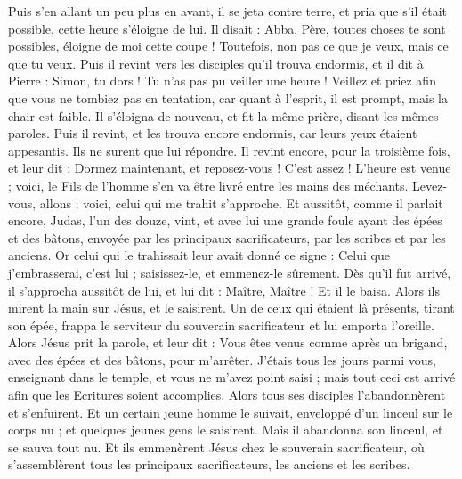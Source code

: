 \begin{multicols}{2}
Puis s'en allant un peu plus en avant, il se jeta contre terre, et pria que s'il était possible, cette heure s’éloigne de lui.
Il disait : Abba, Père, toutes choses te sont possibles, éloigne de moi cette coupe ! Toutefois, non pas ce que je veux, mais ce que tu veux.
Puis il revint vers les disciples qu’il trouva endormis, et il dit à Pierre : Simon, tu dors ! Tu n’as pas pu veiller une heure !
Veillez et priez afin que vous ne tombiez pas en tentation, car quant à l’esprit, il est prompt, mais la chair est faible.
Il s’éloigna de nouveau, et fit la même prière, disant les mêmes paroles.
Puis il revint, et les trouva encore endormis, car leurs yeux étaient appesantis. Ils ne surent que lui répondre.
Il revint encore, pour la troisième fois, et leur dit : Dormez maintenant, et reposez-vous ! C’est assez ! L’heure est venue ; voici, le Fils de l'homme s'en va être livré entre les mains des méchants.
Levez-vous, allons ; voici, celui qui me trahit s'approche.
Et aussitôt, comme il parlait encore, Judas, l'un des douze, vint, et avec lui une grande foule ayant des épées et des bâtons, envoyée par les principaux sacrificateurs, par les scribes et par les anciens.
Or celui qui le trahissait leur avait donné ce signe : Celui que j'embrasserai, c’est lui ; saisissez-le, et emmenez-le sûrement.
Dès qu’il fut arrivé, il s'approcha aussitôt de lui, et lui dit : Maître, Maître ! Et il le baisa.
Alors ils mirent la main sur Jésus, et le saisirent.
Un de ceux qui étaient là présents, tirant son épée, frappa le serviteur du souverain sacrificateur et lui emporta l'oreille.
Alors Jésus prit la parole, et leur dit : Vous êtes venus comme après un brigand, avec des épées et des bâtons, pour m’arrêter.
J’étais tous les jours parmi vous, enseignant dans le temple, et vous ne m'avez point saisi ; mais tout ceci est arrivé afin que les Ecritures soient accomplies.
Alors tous ses disciples l'abandonnèrent et s'enfuirent.
Et un certain jeune homme le suivait, enveloppé d’un linceul sur le corps nu ; et quelques jeunes gens le saisirent.
Mais il abandonna son linceul, et se sauva tout nu.
Et ils emmenèrent Jésus chez le souverain sacrificateur, où s'assemblèrent tous les principaux sacrificateurs, les anciens et les scribes.

\end{multicols}
